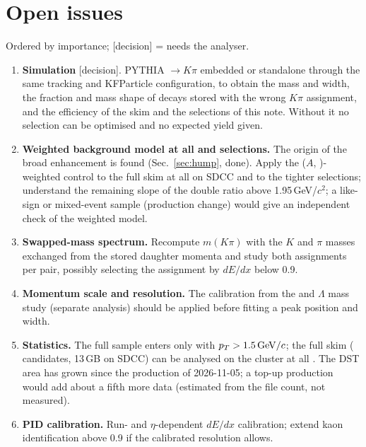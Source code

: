 \section{Open issues}
\label{sec:open}

Ordered by importance; [decision] = needs the analyser.

\begin{enumerate}
\item \textbf{Simulation} [decision]. PYTHIA \Dzero$\to K\pi$ embedded or standalone through the same tracking and
  KFParticle configuration, to obtain the \Dzero{} mass and width, the fraction and mass shape of decays stored with the
  wrong $K\pi$ assignment, and the efficiency of the skim and the selections of this note. Without it no selection can
  be optimised and no expected yield given.
\item \textbf{Weighted background model at all \pt{} and selections.} The origin of the broad enhancement is found
  (Sec.~\ref{sec:hump}, done). Apply the ($A$, \pt)-weighted control to the full skim at all \pt{} on SDCC and to the
  tighter selections; understand the remaining slope of the double ratio above 1.95\,GeV/$c^2$; a like-sign or
  mixed-event sample (production change) would give an independent check of the weighted model.
\item \textbf{Swapped-mass spectrum.} Recompute $m(K\pi)$ with the $K$ and $\pi$ masses exchanged from the stored
  daughter momenta and study both assignments per pair, possibly selecting the assignment by $dE/dx$ below 0.9\gevc.
\item \textbf{Momentum scale and resolution.} The calibration from the \Ks{} and $\Lambda$ mass study (separate
  analysis) should be applied before fitting a \Dzero{} peak position and width.
\item \textbf{Statistics.} The full sample enters only with \Dzero{} $p_T>1.5\,\mathrm{GeV}/c$; the full skim (\fullOut{} candidates,
  13\,GB on SDCC) can be analysed on the cluster at all \pt. The DST area has grown since the production of 2026-11-05;
  a top-up production would add about a fifth more data (estimated from the file count, not measured).
\item \textbf{PID calibration.} Run- and $\eta$-dependent $dE/dx$ calibration; extend kaon identification above
  0.9\gevc{} if the calibrated resolution allows.
\end{enumerate}

